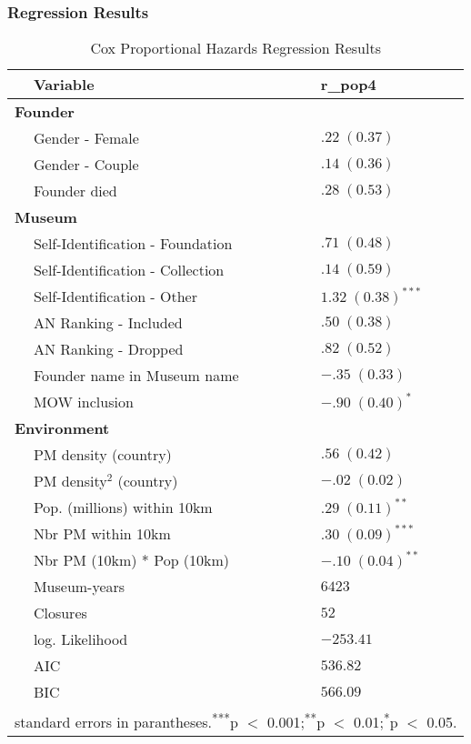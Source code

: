 \documentclass[12pt]{article}
\begin{document}
\subsubsection*{Regression Results}
\label{sec:org4878b83}

\begin{table}[ht]
\centering
\begin{tabular}{p{0mm}ll}
  \hline 
 \multicolumn{1}{l}{} & \multicolumn{1}{l}{Variable} & \multicolumn{1}{l}{r\_pop4}\\ 
 \hline
  \multicolumn{3}{l}{\textbf{Founder}} \\ 
 & Gender - Female & $.22 \; (0.37)$ \\ 
   & Gender - Couple & $.14 \; (0.36)$ \\ 
   & Founder died & $.28 \; (0.53)$ \\ 
   \multicolumn{3}{l}{\textbf{Museum}} \\ 
 & Self-Identification - Foundation & $.71 \; (0.48)$ \\ 
   & Self-Identification - Collection & $.14 \; (0.59)$ \\ 
   & Self-Identification - Other & $1.32 \; (0.38)^{***}$ \\ 
   & AN Ranking - Included & $.50 \; (0.38)$ \\ 
   & AN Ranking - Dropped & $.82 \; (0.52)$ \\ 
   & Founder name in Museum name & $-.35 \; (0.33)$ \\ 
   & MOW inclusion & $-.90 \; (0.40)^{*}$ \\ 
   \multicolumn{3}{l}{\textbf{Environment}} \\ 
 & PM density (country) & $.56 \; (0.42)$ \\ 
   & PM density$^{2}$ (country) & $-.02 \; (0.02)$ \\ 
   & Pop. (millions) within 10km & $.29 \; (0.11)^{**}$ \\ 
   & Nbr PM within 10km & $.30 \; (0.09)^{***}$ \\ 
   & Nbr PM (10km) * Pop (10km) & $-.10 \; (0.04)^{**}$ \\ 
   \hline
 & Museum-years & $6423$ \\ 
   & Closures & $52$ \\ 
   & log. Likelihood & $-253.41$ \\ 
   & AIC & $536.82$ \\ 
   & BIC & $566.09$ \\ 
   \hline 
 \multicolumn{3}{l}{\footnotesize{standard errors in parantheses.\textsuperscript{***}p $<$ 0.001;\textsuperscript{**}p $<$ 0.01;\textsuperscript{*}p $<$ 0.05.}}
\end{tabular}
\caption{Cox Proportional Hazards Regression Results} 
\label{tbl:t_reg_coxph}
\end{table}
\end{document}
